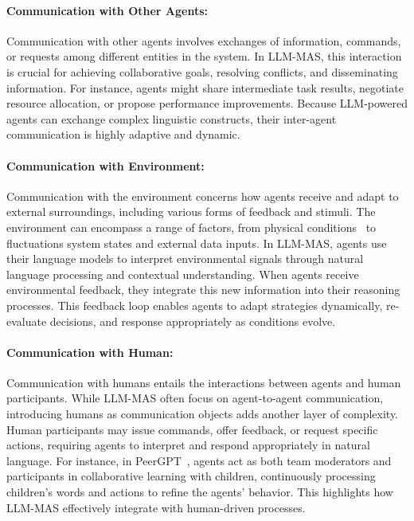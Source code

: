 \paragraph{Communication with Other Agents:}Communication with other agents involves exchanges of information, commands, or requests among different entities in the system. In LLM-MAS, this interaction is crucial for achieving collaborative goals, resolving conflicts, and disseminating information. For instance, agents might share intermediate task results, negotiate resource allocation, or propose performance improvements.  Because LLM-powered agents can exchange complex linguistic constructs, their inter-agent communication is highly adaptive and dynamic. 

\paragraph{Communication with Environment:}Communication with the environment concerns how agents receive and adapt to external surroundings, including various forms of feedback and stimuli. The environment can encompass a range of factors, from physical conditions~\cite{embodied_agents} to fluctuations system states and external data inputs. In LLM-MAS, agents use their language models to interpret environmental signals through natural language processing and contextual understanding. When agents receive environmental feedback, they integrate this new information into their reasoning processes. This feedback loop enables agents to adapt strategies dynamically, re-evaluate decisions, and response appropriately as conditions evolve.

\paragraph{Communication with Human:}Communication with humans entails the interactions between agents and human participants. While LLM-MAS often focus on agent-to-agent communication, introducing humans as communication objects adds another layer of complexity. Human participants may issue commands, offer feedback, or request specific actions, requiring agents to interpret and respond appropriately in natural language. For instance, in PeerGPT~\cite{peergpt}, agents act as both team moderators and participants in collaborative learning with children, continuously processing children’s words and actions to refine the agents’ behavior. This highlights how LLM-MAS effectively integrate with human-driven processes.

